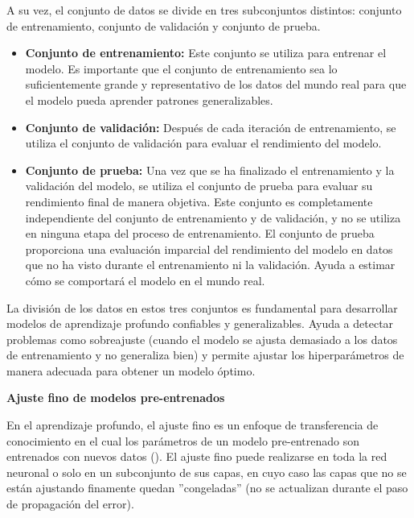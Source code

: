 A su vez, el conjunto de datos se divide en tres subconjuntos distintos: conjunto de entrenamiento, conjunto de validación y conjunto de prueba. 

\begin{itemize}
    \item \textbf{Conjunto de entrenamiento:} Este conjunto se utiliza para entrenar el modelo. Es importante que el conjunto de entrenamiento sea lo suficientemente grande y representativo de los datos del mundo real para que el modelo pueda aprender patrones generalizables.
    \item \textbf{Conjunto de validación:} Después de cada iteración de entrenamiento, se utiliza el conjunto de validación para evaluar el rendimiento del modelo.
    \item \textbf{Conjunto de prueba:} Una vez que se ha finalizado el entrenamiento y la validación del modelo, se utiliza el conjunto de prueba para evaluar su rendimiento final de manera objetiva. Este conjunto es completamente independiente del conjunto de entrenamiento y de validación, y no se utiliza en ninguna etapa del proceso de entrenamiento. El conjunto de prueba proporciona una evaluación imparcial del rendimiento del modelo en datos que no ha visto durante el entrenamiento ni la validación. Ayuda a estimar cómo se comportará el modelo en el mundo real.
\end{itemize}

La división de los datos en estos tres conjuntos es fundamental para desarrollar modelos de aprendizaje profundo confiables y generalizables. Ayuda a detectar problemas como sobreajuste (cuando el modelo se ajusta demasiado a los datos de entrenamiento y no generaliza bien) y permite ajustar los hiperparámetros de manera adecuada para obtener un modelo óptimo.

{\large \textbf{Ajuste fino de modelos pre-entrenados}}

En el aprendizaje profundo, el ajuste fino es un enfoque de transferencia de conocimiento en el cual los parámetros de un modelo pre-entrenado son entrenados con nuevos datos (\cite{quinn2020}). El ajuste fino puede realizarse en toda la red neuronal o solo en un subconjunto de sus capas, en cuyo caso las capas que no se están ajustando finamente quedan ''congeladas'' (no se actualizan durante el paso de propagación del error).

